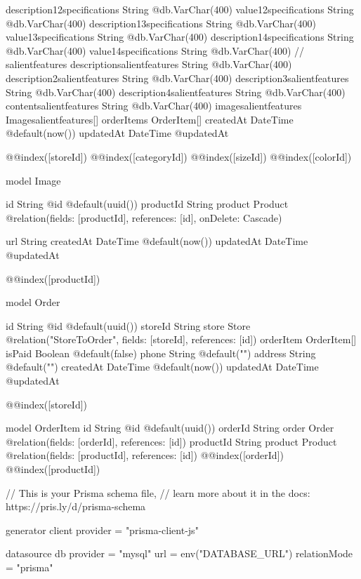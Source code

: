 {  description12specifications String     @db.VarChar(400)
  value12specifications       String     @db.VarChar(400)
  description13specifications String     @db.VarChar(400)
  value13specifications       String     @db.VarChar(400)
  description14specifications String     @db.VarChar(400)
  value14specifications       String     @db.VarChar(400)
  // salientfeatures
  descriptionsalientfeatures String      @db.VarChar(400)
  description2salientfeatures String     @db.VarChar(400)
  description3salientfeatures String     @db.VarChar(400)
  description4salientfeatures String     @db.VarChar(400)
  contentsalientfeatures      String     @db.VarChar(400)
  imagesalientfeatures        Imagesalientfeatures[]
  orderItems                  OrderItem[]
  createdAt                   DateTime   @default(now())
  updatedAt                   DateTime   @updatedAt

  @@index([storeId])
  @@index([categoryId])
  @@index([sizeId])
  @@index([colorId])
}

model Image {
  id        String  @id @default(uuid())
  productId String
  product   Product @relation(fields: [productId], references: [id], onDelete: Cascade)

  url       String
  createdAt DateTime @default(now())
  updatedAt DateTime @updatedAt

  @@index([productId])
}

model Order {
  id        String      @id @default(uuid())
  storeId   String
  store     Store       @relation("StoreToOrder", fields: [storeId], references: [id])
  orderItem OrderItem[]
  isPaid    Boolean     @default(false)
  phone     String      @default("")
  address   String      @default("")
  createdAt DateTime    @default(now())
  updatedAt DateTime    @updatedAt

  @@index([storeId])
}

model OrderItem {
  id        String  @id @default(uuid())
  orderId   String
  order     Order   @relation(fields: [orderId], references: [id])
  productId String
  product   Product @relation(fields: [productId], references: [id])
  @@index([orderId])
  @@index([productId])
}





// This is your Prisma schema file,
// learn more about it in the docs: https://pris.ly/d/prisma-schema

generator client {
  provider = "prisma-client-js"
}

datasource db {
  provider     = "mysql"
  url          = env("DATABASE_URL")
  relationMode = "prisma"
}

